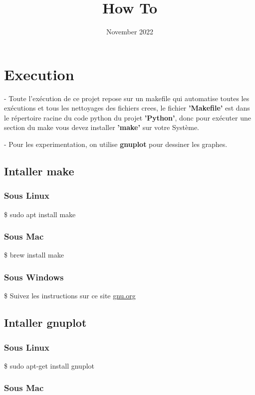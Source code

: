 \documentclass{article}
\title{How To}
\date{November 2022}
\begin{document}
\maketitle

\section{Execution}
- Toute l'exécution de ce projet repose sur un makefile qui automatise toutes les exécutions et tous les nettoyages des fichiers crees, le fichier \textbf{'Makefile'} est dans le  répertoire racine du code python du projet \textbf{'Python'}, donc pour exécuter une section du make vous devez installer \textbf{'make'} sur votre Système.

- Pour les experimentation, on utilise \textbf{gnuplot} pour dessiner les graphes.
\subsection{Intaller make}
\subsubsection{Sous Linux}

\tabto{1cm}\$ sudo apt install make
    
\subsubsection{Sous Mac}

\tabto{1cm}\$ brew install make

\subsubsection{Sous Windows}

\tabto{1cm}\$ Suivez les instructions sur ce site \href{https://www.gnu.org/software/make/}{gnu.org}

\subsection{Intaller gnuplot}
\subsubsection{Sous Linux}

\tabto{1cm}\$ sudo apt-get install gnuplot
    
\subsubsection{Sous Mac}
\end{document}

